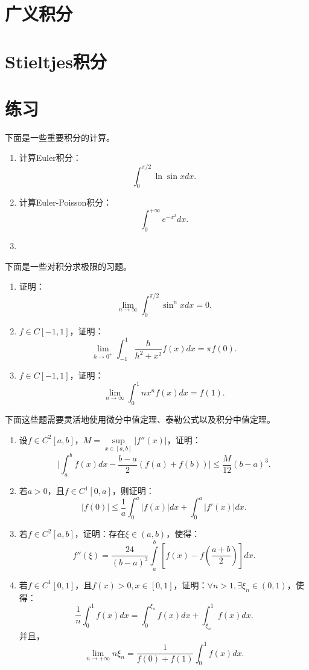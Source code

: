     \section{广义积分}

    \section{Stieltjes积分}
    \section{练习}
    下面是一些重要积分的计算。
    \begin{exercise}
        \begin{enumerate}
            \item 计算Euler积分：$$\int_{0}^{\pi/2}\ln\sin xdx.$$
            \item 计算Euler-Poisson积分：$$\int_{0}^{+\infty}e^{-x^2}dx.$$
            \item 
        \end{enumerate}
    \end{exercise}
    下面是一些对积分求极限的习题。
    \begin{exercise}
        \begin{enumerate}
            \item 证明：$$\lim\limits_{n\rightarrow\infty}\int_{0}^{\pi/2}\sin^nxdx=0.$$
            \item $f\in C\left[-1,1\right]$，证明：$$\lim\limits_{h\rightarrow0^+}\int_{-1}^{1}\frac{h}{h^2+x^2}f(x)dx= \pi f(0).$$
            \item $f\in C\left[-1,1\right]$，证明：$$\lim\limits_{n\rightarrow\infty}\int_{0}^{1}nx^nf(x)dx=f(1).$$
        \end{enumerate}
    \end{exercise}
    下面这些题需要灵活地使用微分中值定理、泰勒公式以及积分中值定理。
    \begin{exercise}
        \begin{enumerate}
            \item 设$f\in C^2\left[a,b\right]$，$M=\sup\limits_{x\in\left[a,b\right]}\lvert f''(x)\rvert$，证明：$$\lvert\int_{a}^{b}f(x)dx-\frac{b-a}{2}\left(f(a)+f(b)\right)\rvert\leq\frac{M}{12}(b-a)^3.$$
            \item 若$a>0$，且$f\in C^1\left[0,a\right]$，则证明：$$\lvert f(0)\rvert\leq\frac{1}{a}\int_{0}^{a}\lvert f(x)\rvert dx+\int_{0}^{a}\lvert f'(x)\rvert dx.$$
            \item 若$f\in C^2\left[a,b\right]$，证明：存在$\xi\in\left(a,b\right)$，使得：$$f''(\xi)=\frac{24}{(b-a)^3}\int\limits_{a}^{b}\left[f(x)-f(\frac{a+b}{2})\right]dx.$$
            \item 若$f\in C^1\left[0,1\right]$，且$f(x)>0,x\in\left[0,1\right]$，证明：$\forall n>1,\exists \xi_n\in\left(0,1\right)$，使得：$$\frac{1}{n}\int_{0}^{1}f(x)dx=\int_{0}^{\xi_n}f(x)dx+\int_{\xi_n}^{1}f(x)dx.$$并且，
            \[\lim\limits_{n\rightarrow+\infty}n\xi_n=\frac{1}{f(0)+f(1)}\int_{0}^{1}f(x)dx.\]
        \end{enumerate}
    \end{exercise}

